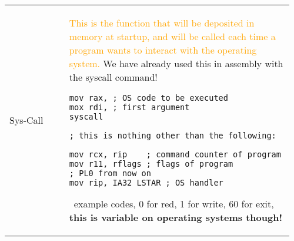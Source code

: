 \documentclass[main.tex,fontsize=8pt,paper=a4,paper=portrait,DIV=calc,]{scrartcl}
\begin{document}
\pagebreak
\begin{table}[ht!]
\begin{tabular}{|m{0.2\linewidth}|m{0.755\linewidth}|}
\hline
Sys-Call & 
\textcolor{Orange}{This is the function that will be deposited in memory at startup, and will be called each time a program wants to interact with the operating system.}\newline
We have already used this in assembly with the syscall command!\newline
\begin{lstlisting}
mov rax, ; OS code to be executed
mox rdi, ; first argument
syscall

; this is nothing other than the following: 

mov rcx, rip    ; command counter of program
mov r11, rflags ; flags of program
; PL0 from now on 
mov rip, IA32_LSTAR ; OS handler
\end{lstlisting} 
\, \newline
example codes, 0 for red, 1 for write, 60 for exit, \textbf{this is variable on operating systems though!}\newline


\end{tabular}
\end{table}
\end{document}
